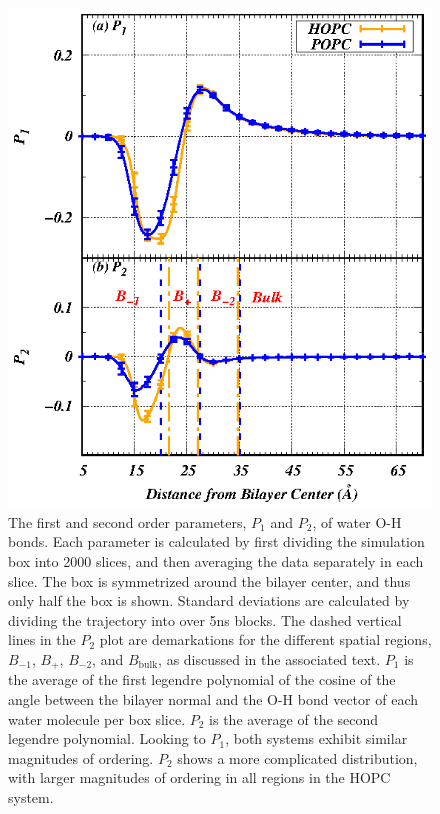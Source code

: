 \documentclass[12pt,openany,final]{book}
\begin{document}
\begin{figure}[p]
    \caption[The first and second order parameters, $P_1$ and $P_2$, of water O-H bonds.]{ 
The first and second order parameters, $P_1$ and $P_2$, of water O-H bonds. Each parameter is calculated by first dividing the simulation box into 2000 slices, 
and then averaging the data separately in each slice. The box is symmetrized around the bilayer center, and thus 
only half the box is shown. Standard deviations are calculated by dividing 
the trajectory into over 5ns blocks. The dashed vertical lines in the $P_2$ 
plot are demarkations for the different spatial regions, $B_{-1}$, $B_{+}$, $B_{-2}$, and $B_\text{bulk}$, as discussed in the associated text.
$P_1$ is the average of the first legendre polynomial of the cosine of the angle between the bilayer normal and the O-H bond vector of each water molecule per box slice. 
$P_2$ is the average of the second legendre polynomial.
Looking to $P_1$, both systems exhibit similar magnitudes of ordering. $P_2$ shows a more complicated distribution, with larger magnitudes of ordering in all regions in the HOPC system.}
\label{fig:h2order}
\includegraphics[height=0.66\textheight]{h2order.eps}
\end{figure}
\end{document}
